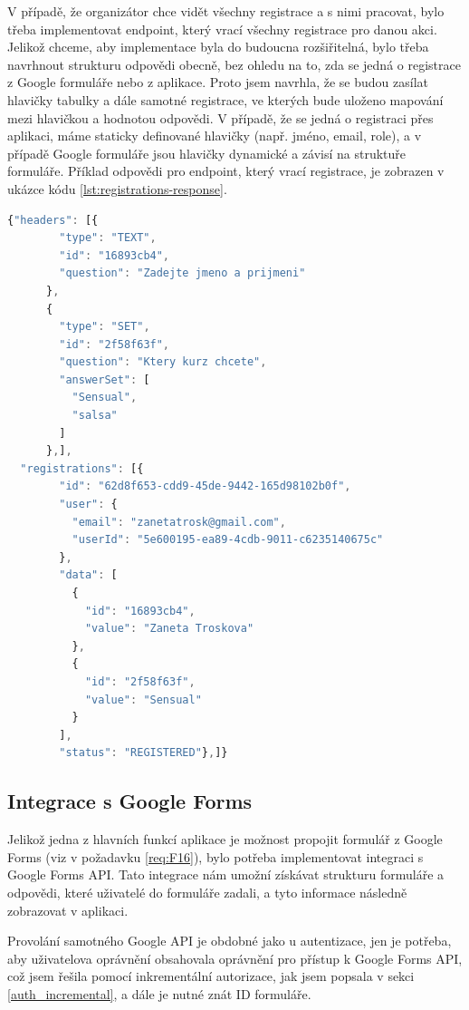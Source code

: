 V případě, že organizátor chce vidět všechny registrace a s nimi pracovat, bylo třeba implementovat endpoint, který vrací všechny registrace pro danou akci. Jelikož chceme, aby implementace byla do budoucna rozšiřitelná, bylo třeba navrhnout strukturu odpovědi obecně, bez ohledu na to, zda se jedná o registrace z Google formuláře nebo z aplikace. Proto jsem navrhla, že se budou zasílat hlavičky tabulky a dále samotné registrace, ve kterých bude uloženo mapování mezi hlavičkou a hodnotou odpovědi. V případě, že se jedná o registraci přes aplikaci, máme staticky definované hlavičky (např. jméno, email, role), a v případě Google formuláře jsou hlavičky dynamické a závisí na struktuře formuláře. Příklad odpovědi pro endpoint, který vrací registrace, je zobrazen v ukázce kódu \ref{lst:registrations-response}.

\begin{lstlisting}[language=TypeScript, caption={Příklad části struktury odpovědi pro endpoint vracející registrace}, label={lst:registrations-response}]
{"headers": [{
        "type": "TEXT",
        "id": "16893cb4",
        "question": "Zadejte jmeno a prijmeni"
      },
      {
        "type": "SET",
        "id": "2f58f63f",
        "question": "Ktery kurz chcete",
        "answerSet": [
          "Sensual",
          "salsa"
        ]
      },],
  "registrations": [{
        "id": "62d8f653-cdd9-45de-9442-165d98102b0f",
        "user": {
          "email": "zanetatrosk@gmail.com",
          "userId": "5e600195-ea89-4cdb-9011-c6235140675c"
        },
        "data": [
          {
            "id": "16893cb4",
            "value": "Zaneta Troskova"
          },
          {
            "id": "2f58f63f",
            "value": "Sensual"
          }
        ],
        "status": "REGISTERED"},]}
\end{lstlisting}

\subsection{Integrace s Google Forms}
Jelikož jedna z hlavních funkcí aplikace je možnost propojit formulář z Google Forms (viz v požadavku \ref{req:F16}), bylo potřeba implementovat integraci s Google Forms API. Tato integrace nám umožní získávat strukturu formuláře a odpovědi, které uživatelé do formuláře zadali, a tyto informace následně zobrazovat v aplikaci.

Provolání samotného Google API je obdobné jako u autentizace, jen je potřeba, aby uživatelova oprávnění obsahovala oprávnění pro přístup k Google Forms API, což jsem řešila pomocí inkrementální autorizace, jak jsem popsala v sekci \ref{auth_incremental}, a dále je nutné znát ID formuláře. \cite{google_forms_get_method}

